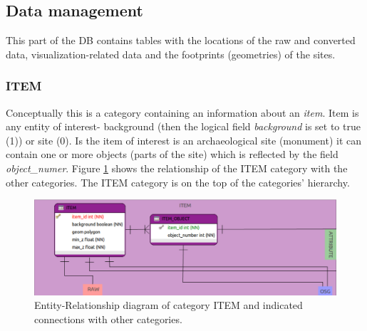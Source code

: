 \subsection {Data management}
This part of the DB contains tables with the locations of the raw and converted data, visualization-related data and the footprints (geometries) of the sites.

\subsubsection{ITEM}
Conceptually this is a category containing an information about an {\em item}. Item is any entity of interest- background (then the logical field {\em background} is set to true (1)) or site (0). Is the item of interest is an archaeological site (monument) it can contain one or more objects (parts of the site) which is reflected by the field {\em object\_numer}. Figure \ref{fig:db_erdb_item} shows the relationship of the ITEM category with the other categories. The ITEM category is on the top of the categories' hierarchy.
\begin{figure}[H]
\centering
\includegraphics[scale=0.35]{fig/database/ERDB_ITEM_conn.pdf}
\caption{Entity-Relationship diagram of category ITEM and indicated connections with other categories.}
\label{fig:db_erdb_item}
\end{figure}

